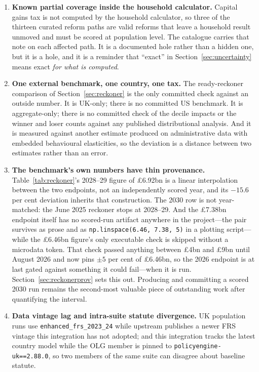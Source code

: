 \begin{enumerate}
\item \textbf{Known partial coverage inside the household calculator.} Capital gains tax is not computed by the household calculator, so three of the thirteen curated reform paths are valid reforms that leave a household result unmoved and must be scored at population level. The catalogue carries that note on each affected path. It is a documented hole rather than a hidden one, but it is a hole, and it is a reminder that ``exact'' in Section~\ref{sec:uncertainty} means exact \emph{for what is computed}.

\item \textbf{One external benchmark, one country, one tax.} The ready-reckoner comparison of Section~\ref{sec:reckoner} is the only committed check against an outside number. It is UK-only; there is no committed US benchmark. It is aggregate-only; there is no committed check of the decile impacts or the winner and loser counts against any published distributional analysis. And it is measured against another estimate produced on administrative data with embedded behavioural elasticities, so the deviation is a distance between two estimates rather than an error.

\item \textbf{The benchmark's own numbers have thin provenance.} Table~\ref{tab:reckoner}'s 2028--29 figure of \pounds 6.92bn is a linear interpolation between the two endpoints, not an independently scored year, and its $-15.6$ per cent deviation inherits that construction. The 2030 row is not year-matched: the June 2025 reckoner stops at 2028--29. And the \pounds 7.38bn endpoint itself has no scored-run artifact anywhere in the project---the pair survives as prose and as \texttt{np.linspace(6.46, 7.38, 5)} in a plotting script---while the \pounds 6.46bn figure's only executable check is skipped without a microdata token. That check passed anything between \pounds 4bn and \pounds 9bn until August 2026 and now pins $\pm 5$ per cent of \pounds 6.46bn, so the 2026 endpoint is at last gated against something it could fail---when it is run. Section~\ref{sec:reckonerprov} sets this out. Producing and committing a scored 2030 run remains the second-most valuable piece of outstanding work after quantifying the interval.

\item \textbf{Data vintage lag and intra-suite statute divergence.} UK population runs use \texttt{enhanced\_frs\_2023\_24} while upstream publishes a newer FRS vintage this integration has not adopted; and this integration tracks the latest country model while the OLG member is pinned to \texttt{policyengine-uk==2.88.0}, so two members of the same suite can disagree about baseline statute.


\end{enumerate}
